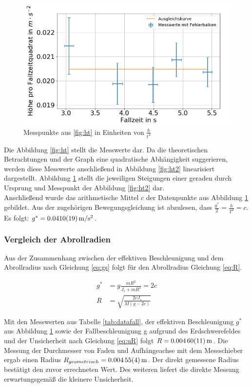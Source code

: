\begin{figure}[h!]
	\centering
	\includegraphics[width=0.7\linewidth]{auswertung/Fallrad/T,ht^-2}
	\caption{Messpunkte aus \cref{fig:ht} in Einheiten von $\frac{h}{t^2}$}
	\label{fig:tht-2}
\end{figure}





Die Abbildung \ref{fig:ht} stellt die Messwerte dar. Da die theoretischen Betrachtungen und der Graph eine quadratische Abhängigkeit suggerieren, werden diese Messwerte anschließend in Abbildung \ref{fig:ht2} linearisiert dargestellt. Abbildung \ref{fig:tht-2} stellt die jeweiligen Steigungen einer geraden durch Ursprung und Messpunkt der Abbildung \ref{fig:ht2} dar. \\






Anschließend wurde das arithmetische Mittel $c$ der Datenpunkte aus Abbildung \ref{fig:tht-2} gebildet. Aus der zugehörigen Bewegungsgleichung ist abzulesen, dass $\frac{g^*}{2}=\frac{h}{T^2}=c$. Es folgt: $g^*=\SI{0.0410 \pm  0.0019}{m \per s \squared}$.





\subsubsection{Vergleich der Abrollradien}


Aus der Zusammenhang zwischen der effektiven Beschleunigung und  dem Abrollradius nach Gleichung \ref{eq:gs} folgt für den Abrollradius Gleichung \ref{eq:R}.

\begin{align}
g^*  &= g \frac{mR^2}{J_s + m R^2}= 2c \label{eq:gs}\\
R&=\sqrt{\frac{2 c J_s}{M (g-2c)}} \label{eq:R}
\end{align}

Mit den Messwerten aus Tabelle \ref{tab:datafall}, der effektiven Beschleunigung $g^*$ aus Abbildung \ref{fig:tht-2} sowie der Fallbeschleunigung g aufgrund des Erdschwerefeldes und der Unsicherheit nach Gleichung \ref{eq:uR} folgt $R=\SI{0.00460\pm 0.00011}{m}$. Die Messung der Durchmesser von Faden und Aufhängeachse mit dem Messschieber ergab einen Radius $R_{geometrisch}=\SI{0.00455 \pm 0.00004}{m}$. Der direkt gemessene Radius bestätigt den zuvor errechneten Wert. Des weiteren liefert die direkte Messung erwartungsgemäß die kleinere Unsicherheit.  